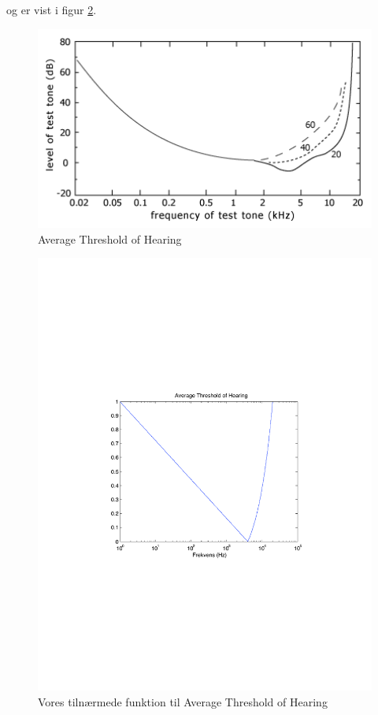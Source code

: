 og er vist i figur \ref{fig.vores-ath}.
\begin{figure}[h!]
\begin{center}
\includegraphics[width=12cm]{ATH}
\end{center}
\caption{Average Threshold of Hearing}
\label{fig.ath}
\end{figure}
\begin{figure}[h!]
\begin{center}
\includegraphics[width=12cm]{vores-ath}
\end{center}
\caption{Vores tilnærmede funktion til Average Threshold of Hearing}
\label{fig.vores-ath}
\end{figure}

